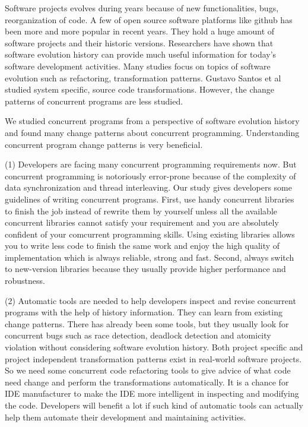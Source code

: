 \documentclass[conference]{IEEEtran}
\begin{document}
Software projects evolves during years because of new functionalities, bugs, reorganization of code. A few of open source software platforms like github has been more and more popular in recent years. They hold a huge amount of software projects and their historic versions. Researchers have shown that software evolution history can provide much useful information for today's software development activities. Many studies focus on topics of software evolution such as refactoring, transformation patterns. Gustavo Santos et al \cite{conf/icsm/SantosAEDV15} studied system specific, source code transformations. However, the change patterns of concurrent programs are less studied.

We studied concurrent programs from a perspective of software evolution history and found many change patterns about concurrent programming. Understanding concurrent program change patterns is very beneficial.

(1) Developers are facing many concurrent programming requirements now. But concurrent programming is notoriously error-prone because of the complexity of data synchronization and thread interleaving. Our study gives developers some guidelines of writing concurrent programs. First, use handy concurrent libraries to finish the job instead of rewrite them by yourself unless all the available concurrent libraries cannot satisfy your requirement and you are absolutely confident of your comcurrent programming skills. Using existing libraries allows you to  write less code to finish the same work and enjoy the high quality of implementation which is always reliable, strong and fast. Second, always switch to new-version libraries because they usually provide higher performance and robustness.

(2) Automatic tools are needed to help developers inspect and revise concurrent programs with the help of history information. They can learn from existing change patterns. There has already been some tools, but they usually look for concurrent bugs such as race detection, deadlock detection and atomicity violation without considering software evolution history. Both project specific and project independent transformation patterns exist in real-world software projects. So we need some concurrent code refactoring tools to give advice of what code need change and perform the transformations automatically. It is a chance for IDE manufacturer to make the IDE more intelligent in inspecting and modifying the code. Developers will benefit a lot if such kind of automatic tools can actually help them automate their development and maintaining activities.
\end{document}
